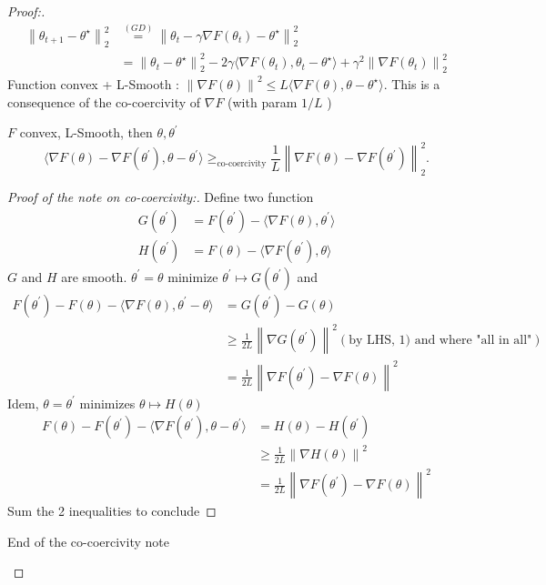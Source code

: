 \begin{proof}[Proof:]
    \begin{align*}
        \left\| \theta _{t+1} - \theta ^\star  \right\| ^2 _2  
            &\overset{(GD)}{=} \left\| \theta _t - \gamma \nabla F(\theta _t) - \theta ^\star  \right\| ^2 _2 \\
            &= \left\| \theta _t - \theta ^\star  \right\| ^2 _2 - 2 \gamma  \langle \nabla F(\theta _t), \theta _t - \theta ^\star \rangle + \gamma ^2 \left\| \nabla F(\theta _t) \right\| ^2 _2
    \end{align*}
    Function convex + L-Smooth : $ \left\| \nabla F(\theta ) \right\| ^2 \leq L \langle \nabla F(\theta ), \theta  - \theta ^\star \rangle $. This is a consequence of the co-coercivity of $ \nabla F $ (with param $ 1/L $ )
    \begin{note}[Co-coercivity]
        $ F $ convex, L-Smooth, then $ \theta , \theta ^\prime  $ 
        \[
            \langle  \nabla F(\theta ) - \nabla F(\theta ^\prime ), \theta  - \theta ^\prime \rangle \geq_{\text{co-coercivity}} \frac{1}{L} \left\| \nabla F(\theta ) - \nabla F(\theta ^\prime ) \right\| ^2 _2
        .\]
        \begin{proof}[Proof of the note on co-coercivity:]
            Define two function \begin{align*}
                G(\theta ^\prime ) &= F(\theta ^\prime ) - \langle \nabla F(\theta ) , \theta ^\prime \rangle  \\
                H(\theta ^\prime ) &= F(\theta ) - \langle \nabla F(\theta ^\prime ), \theta \rangle 
            \end{align*}
            $ G $ and $ H $ are smooth. $ \theta ^\prime = \theta  $ minimize $ \theta ^\prime  \mapsto G(\theta ^\prime ) $ and 
            \begin{align*}
                F(\theta ^\prime) - F(\theta ) - \langle \nabla F(\theta ) , \theta ^\prime - \theta  \rangle
                    &= G(\theta ^\prime) - G(\theta ) \\
                    &\geq \frac{1}{2L} \left\| \nabla G(\theta ^\prime ) \right\| ^2 (\text{by LHS, 1) and where "all in all"} ) \\
                    &= \frac{1}{2L} \left\| \nabla F(\theta ^\prime ) - \nabla F(\theta ) \right\| ^2
            \end{align*} 
            Idem, $ \theta  = \theta ^\prime  $ minimizes $ \theta \mapsto H(\theta ) $ 
            \begin{align*}
                F(\theta ) - F(\theta ^\prime ) - \langle \nabla F(\theta ^\prime ), \theta  - \theta ^\prime \rangle &= H (\theta ) - H(\theta ^\prime ) \\
                &\geq \frac{1}{2L} \left\| \nabla H(\theta )  \right\| ^2 \\
                &= \frac{1}{2L} \left\| \nabla F(\theta ^\prime ) - \nabla F(\theta ) \right\| ^2
            \end{align*}
            Sum the 2 inequalities to conclude
        \end{proof}
        End of the co-coercivity note
    \end{note}
    

\end{proof}
